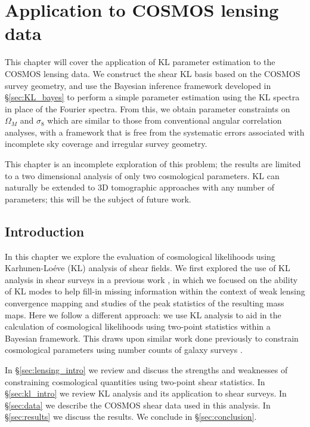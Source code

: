 \chapter{Application to COSMOS lensing data}

This chapter will cover the application of KL parameter estimation to the 
COSMOS lensing data.  We construct the shear KL basis based on the COSMOS
survey geometry, and use the Bayesian inference framework developed in
\S\ref{sec:KL_bayes} to perform a simple parameter estimation using
the KL spectra in place of the Fourier spectra.  From this, we obtain
parameter constraints on $\Omega_M$ and $\sigma_8$ which are similar to
those from conventional angular correlation analyses, with a framework that
is free from the systematic errors associated with incomplete sky coverage
and irregular survey geometry.

This chapter is an incomplete exploration of this problem; the results are
limited to a two dimensional analysis of only two cosmological parameters.
KL can naturally be extended to 3D tomographic approaches with any number of
parameters; this will be the subject of future work.

\section{Introduction}
\label{sec:introduction}

In this chapter we explore the evaluation of cosmological
likelihoods using Karhunen-Lo\'{e}ve (KL) analysis of shear fields.  
We first explored the use of KL analysis in shear surveys in a previous work
\citep[Chapter 4;][]{Vanderplas2012}, in which we focused on the ability of
KL modes to help fill-in missing information within the context of weak
lensing convergence mapping and studies of the peak statistics of the
resulting mass maps.
Here we follow a different approach:
we use KL analysis to aid in the calculation of cosmological likelihoods
using two-point statistics within a Bayesian framework.
This draws upon similar work done
previously to constrain cosmological parameters using number counts of
galaxy surveys \citep{Vogeley96, Pope04}.

In \S\ref{sec:lensing_intro} we review and discuss the strengths and
weaknesses of constraining cosmological quantities using two-point shear
statistics.
In \S\ref{sec:kl_intro} we review KL analysis and its application to 
shear surveys.
In \S\ref{sec:data} we describe the COSMOS shear data used in this analysis.
In \S\ref{sec:results} we discuss the results.
We conclude in \S\ref{sec:conclusion}.

